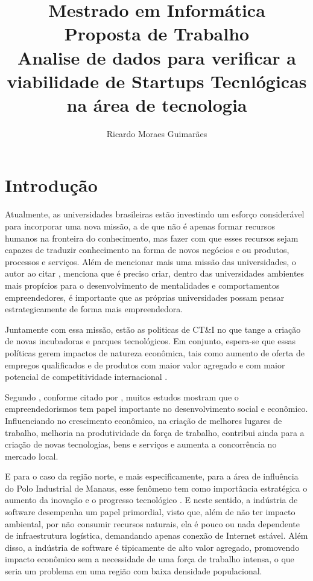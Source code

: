 \documentclass[12pt]{article}
\title{Mestrado em Informática\\ Proposta de Trabalho \\ Analise de dados para verificar a viabilidade de Startups Tecnlógicas na área de tecnologia}
\author{Ricardo Moraes Guimarães\inst{1}}
\begin{document}
\maketitle

\section{Introdução} \label{sec:intro}

Atualmente, as universidades brasileiras estão investindo um esforço considerável para incorporar uma nova missão, a de que não é apenas formar recursos humanos na fronteira do conhecimento, mas fazer com que esses recursos sejam capazes de traduzir conhecimento na forma de novos negócios e ou produtos, processos e serviços. Além de mencionar mais uma missão das universidades, o autor \cite{hannon2013entrepreneurial:2013} ao citar \cite{gibb2012exploring:2012}, menciona que é preciso criar, dentro das universidades ambientes mais propícios para o desenvolvimento de mentalidades e comportamentos empreendedores, é importante que as próprias universidades possam pensar estrategicamente de forma mais empreendedora.

Juntamente com essa missão, estão as politicas de CT\&I no que tange a criação de novas incubadoras e parques tecnológicos. Em conjunto, espera-se que essas políticas gerem impactos de natureza econômica, tais como aumento de oferta de empregos qualificados e de produtos com maior valor agregado e com maior potencial de competitividade internacional \cite{hannon2013entrepreneurial:2013}.

Segundo \cite{dimitriadis2008opinia:2008}, conforme citado por \cite{staniewski2015motivating:2015}, muitos estudos mostram que o empreendedorismos tem papel importante no desenvolvimento social e econômico. Influenciando no crescimento econômico, na criação de melhores lugares de trabalho, melhoria na produtividade da força de trabalho, contribui ainda para a criação de novas tecnologias, bens e serviços e aumenta a concorrência no mercado local.

E para o caso da região norte, e mais especificamente, para a área de influência do Polo Industrial de Manaus, esse fenômeno tem como importância estratégica o aumento da inovação e o progresso tecnológico \cite{hannon2013entrepreneurial:2013}. E neste sentido, a indústria de software desempenha um papel primordial, visto que, além de não ter impacto ambiental, por não consumir recursos naturais, ela é pouco ou nada dependente de infraestrutura logística, demandando apenas conexão de Internet estável. Além disso, a indústria de software é tipicamente de alto valor agregado, promovendo impacto econômico sem a necessidade de uma força de trabalho intensa, o que seria um problema em uma região com baixa densidade populacional.
\end{document}

